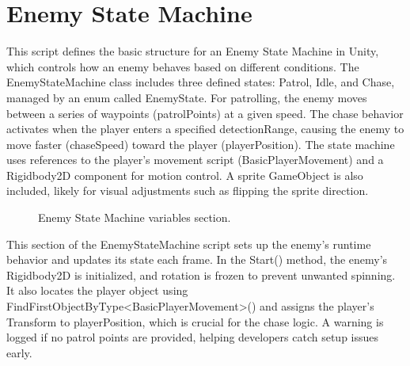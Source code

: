 \documentclass[12pt,oneside,openright,a4paper]{cpe-english-project}
\begin{document}
\section{Enemy State Machine}
This script defines the basic structure for an Enemy State Machine in Unity, which controls how an enemy behaves based on different conditions. The EnemyStateMachine class includes three defined states: Patrol, Idle, and Chase, managed by an enum called EnemyState. For patrolling, the enemy moves between a series of waypoints (patrolPoints) at a given speed. The chase behavior activates when the player enters a specified detectionRange, causing the enemy to move faster (chaseSpeed) toward the player (playerPosition). The state machine uses references to the player’s movement script (BasicPlayerMovement) and a Rigidbody2D component for motion control. A sprite GameObject is also included, likely for visual adjustments such as flipping the sprite direction.
 \begin{figure}[!h]
 \centering
\caption{Enemy State Machine variables section.}\label{fig:ESMvar}
\end{figure}
\newpage
This section of the EnemyStateMachine script sets up the enemy's runtime behavior and updates its state each frame. In the Start() method, the enemy's Rigidbody2D is initialized, and rotation is frozen to prevent unwanted spinning. It also locates the player object using FindFirstObjectByType<BasicPlayerMovement>() and assigns the player's Transform to playerPosition, which is crucial for the chase logic. A warning is logged if no patrol points are provided, helping developers catch setup issues early.
\end{document}
